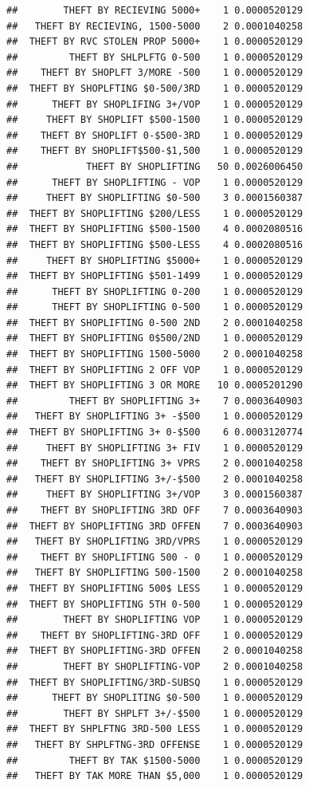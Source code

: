 \documentclass[]{book}
\begin{document}
\begin{verbatim}
##        THEFT BY RECIEVING 5000+    1 0.0000520129
##   THEFT BY RECIEVING, 1500-5000    2 0.0001040258
##  THEFT BY RVC STOLEN PROP 5000+    1 0.0000520129
##         THEFT BY SHLPLFTG 0-500    1 0.0000520129
##    THEFT BY SHOPLFT 3/MORE -500    1 0.0000520129
##  THEFT BY SHOPLFTING $0-500/3RD    1 0.0000520129
##      THEFT BY SHOPLIFING 3+/VOP    1 0.0000520129
##     THEFT BY SHOPLIFT $500-1500    1 0.0000520129
##    THEFT BY SHOPLIFT 0-$500-3RD    1 0.0000520129
##    THEFT BY SHOPLIFT$500-$1,500    1 0.0000520129
##            THEFT BY SHOPLIFTING   50 0.0026006450
##      THEFT BY SHOPLIFTING - VOP    1 0.0000520129
##     THEFT BY SHOPLIFTING $0-500    3 0.0001560387
##  THEFT BY SHOPLIFTING $200/LESS    1 0.0000520129
##  THEFT BY SHOPLIFTING $500-1500    4 0.0002080516
##  THEFT BY SHOPLIFTING $500-LESS    4 0.0002080516
##     THEFT BY SHOPLIFTING $5000+    1 0.0000520129
##  THEFT BY SHOPLIFTING $501-1499    1 0.0000520129
##      THEFT BY SHOPLIFTING 0-200    1 0.0000520129
##      THEFT BY SHOPLIFTING 0-500    1 0.0000520129
##  THEFT BY SHOPLIFTING 0-500 2ND    2 0.0001040258
##  THEFT BY SHOPLIFTING 0$500/2ND    1 0.0000520129
##  THEFT BY SHOPLIFTING 1500-5000    2 0.0001040258
##  THEFT BY SHOPLIFTING 2 OFF VOP    1 0.0000520129
##  THEFT BY SHOPLIFTING 3 OR MORE   10 0.0005201290
##         THEFT BY SHOPLIFTING 3+    7 0.0003640903
##   THEFT BY SHOPLIFTING 3+ -$500    1 0.0000520129
##  THEFT BY SHOPLIFTING 3+ 0-$500    6 0.0003120774
##     THEFT BY SHOPLIFTING 3+ FIV    1 0.0000520129
##    THEFT BY SHOPLIFTING 3+ VPRS    2 0.0001040258
##   THEFT BY SHOPLIFTING 3+/-$500    2 0.0001040258
##     THEFT BY SHOPLIFTING 3+/VOP    3 0.0001560387
##    THEFT BY SHOPLIFTING 3RD OFF    7 0.0003640903
##  THEFT BY SHOPLIFTING 3RD OFFEN    7 0.0003640903
##   THEFT BY SHOPLIFTING 3RD/VPRS    1 0.0000520129
##    THEFT BY SHOPLIFTING 500 - 0    1 0.0000520129
##   THEFT BY SHOPLIFTING 500-1500    2 0.0001040258
##  THEFT BY SHOPLIFTING 500$ LESS    1 0.0000520129
##  THEFT BY SHOPLIFTING 5TH 0-500    1 0.0000520129
##        THEFT BY SHOPLIFTING VOP    1 0.0000520129
##    THEFT BY SHOPLIFTING-3RD OFF    1 0.0000520129
##  THEFT BY SHOPLIFTING-3RD OFFEN    2 0.0001040258
##        THEFT BY SHOPLIFTING-VOP    2 0.0001040258
##  THEFT BY SHOPLIFTING/3RD-SUBSQ    1 0.0000520129
##      THEFT BY SHOPLITING $0-500    1 0.0000520129
##        THEFT BY SHPLFT 3+/-$500    1 0.0000520129
##  THEFT BY SHPLFTNG 3RD-500 LESS    1 0.0000520129
##   THEFT BY SHPLFTNG-3RD OFFENSE    1 0.0000520129
##         THEFT BY TAK $1500-5000    1 0.0000520129
##   THEFT BY TAK MORE THAN $5,000    1 0.0000520129

\end{verbatim}
\end{document}
